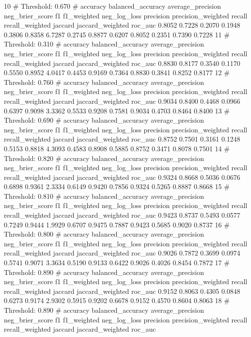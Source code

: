 10
# Threshold: 0.670
# accuracy  balanced_accuracy  average_precision  neg_brier_score  f1  f1_weighted  neg_log_loss  precision  precision_weighted  recall  recall_weighted  jaccard  jaccard_weighted  roc_auc
0.8052
0.7228
0.2070
0.1948
0.3806
0.8358
6.7287
0.2745
0.8877
0.6207
0.8052
0.2351
0.7390
0.7228
11
# Threshold: 0.310
# accuracy  balanced_accuracy  average_precision  neg_brier_score  f1  f1_weighted  neg_log_loss  precision  precision_weighted  recall  recall_weighted  jaccard  jaccard_weighted  roc_auc
0.8830
0.8177
0.3540
0.1170
0.5550
0.8952
4.0417
0.4453
0.9169
0.7364
0.8830
0.3841
0.8252
0.8177
12
# Threshold: 0.760
# accuracy  balanced_accuracy  average_precision  neg_brier_score  f1  f1_weighted  neg_log_loss  precision  precision_weighted  recall  recall_weighted  jaccard  jaccard_weighted  roc_auc
0.9034
0.8400
0.4468
0.0966
0.6397
0.9098
3.3362
0.5533
0.9208
0.7581
0.9034
0.4703
0.8464
0.8400
13
# Threshold: 0.690
# accuracy  balanced_accuracy  average_precision  neg_brier_score  f1  f1_weighted  neg_log_loss  precision  precision_weighted  recall  recall_weighted  jaccard  jaccard_weighted  roc_auc
0.8752
0.7501
0.3161
0.1248
0.5153
0.8818
4.3093
0.4583
0.8908
0.5885
0.8752
0.3471
0.8078
0.7501
14
# Threshold: 0.820
# accuracy  balanced_accuracy  average_precision  neg_brier_score  f1  f1_weighted  neg_log_loss  precision  precision_weighted  recall  recall_weighted  jaccard  jaccard_weighted  roc_auc
0.9324
0.8668
0.5036
0.0676
0.6898
0.9361
2.3334
0.6149
0.9420
0.7856
0.9324
0.5265
0.8887
0.8668
15
# Threshold: 0.810
# accuracy  balanced_accuracy  average_precision  neg_brier_score  f1  f1_weighted  neg_log_loss  precision  precision_weighted  recall  recall_weighted  jaccard  jaccard_weighted  roc_auc
0.9423
0.8737
0.5493
0.0577
0.7249
0.9444
1.9929
0.6707
0.9475
0.7887
0.9423
0.5685
0.9020
0.8737
16
# Threshold: 0.800
# accuracy  balanced_accuracy  average_precision  neg_brier_score  f1  f1_weighted  neg_log_loss  precision  precision_weighted  recall  recall_weighted  jaccard  jaccard_weighted  roc_auc
0.9026
0.7872
0.3699
0.0974
0.5741
0.9071
3.3634
0.5190
0.9133
0.6422
0.9026
0.4026
0.8454
0.7872
17
# Threshold: 0.890
# accuracy  balanced_accuracy  average_precision  neg_brier_score  f1  f1_weighted  neg_log_loss  precision  precision_weighted  recall  recall_weighted  jaccard  jaccard_weighted  roc_auc
0.9152
0.8063
0.4305
0.0848
0.6273
0.9174
2.9302
0.5915
0.9202
0.6678
0.9152
0.4570
0.8604
0.8063
18
# Threshold: 0.890
# accuracy  balanced_accuracy  average_precision  neg_brier_score  f1  f1_weighted  neg_log_loss  precision  precision_weighted  recall  recall_weighted  jaccard  jaccard_weighted  roc_auc
